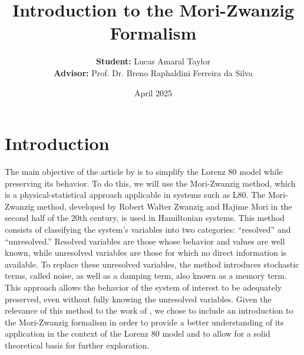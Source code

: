 \documentclass[12pt]{article}
\title{Introduction to the Mori-Zwanzig Formalism}
\date{April 2025}
\author{
    \textbf{Student:} Lucas Amaral Taylor\\
    \textbf{Advisor:} Prof. Dr. Breno Raphaldini Ferreira da Silva
}
\begin{document}
\maketitle
\section{Introduction}
The main objective of the article by \citet{Chekroun2021} is to simplify the Lorenz 80 model while preserving its behavior. To do this, we will use the Mori-Zwanzig method, which is a physical-statistical approach applicable in systems such as L80.
The Mori-Zwanzig method, developed by Robert Walter Zwanzig and Hajime Mori in the second half of the 20th century, is used in Hamiltonian systems. This method consists of classifying the system's variables into two categories: “resolved” and “unresolved.” Resolved variables are those whose behavior and values are well known, while unresolved variables are those for which no direct information is available. To replace these unresolved variables, the method introduces stochastic terms, called noise, as well as a damping term, also known as a memory term. This approach allows the behavior of the system of interest to be adequately preserved, even without fully knowing the unresolved variables.
Given the relevance of this method to the work of \citet{Chekroun2021}, we chose to include an introduction to the Mori-Zwanzig formalism in order to provide a better understanding of its application in the context of the Lorenz 80 model and to allow for a solid theoretical basis for further exploration.
\newpage
\end{document}

